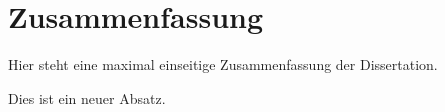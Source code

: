 

\chapter*{Zusammenfassung}

Hier steht eine maximal einseitige Zusammenfassung der
Dissertation.

Dies ist ein neuer Absatz.

